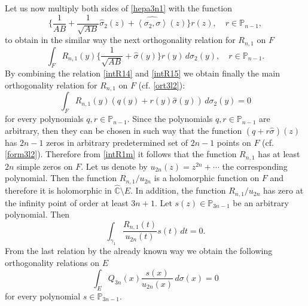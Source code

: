 \documentclass[11pt, a4paper, twoside]{article}
\def\<{\left\langle}
\def\>{\right\rangle}
\let\myh\widehat
\def\CC{\mathbb C}
\def\PP{\mathbb P}
\theoremstyle{plain}
\theoremstyle{definition}
\begin{document}
Let us now multiply both sides of \eqref{hepa3n1} with the function
$$
\biggl\{\frac1{AB}+\frac1{\sqrt{AB}}\myh{\sigma}_2(z)+\myh{\<\sigma_2,\sigma\>}(z)\biggr\}r(z),
\quad r\in\PP_{n-1},
$$
to obtain in the similar way the next orthogonality relation for $R_{n,1}$ on $F$
\begin{equation}
\int_F R_{n,1}(y)\biggl\{\frac1{\sqrt{AB}}+\myh{\sigma}(y)\biggr\}r(y)\,d\sigma_2(y),
\quad r\in\PP_{n-1}.
\label{intR15}
\end{equation}
By combining the relation \eqref{intR14} and \eqref{intR15} we obtain finally the main orthogonality relation for $R_{n,1}$  on $F$ (cf. \eqref{ort3l2}):
\begin{equation}
\int_F R_{n,1}(y)(q(y)+r(y)\myh{\sigma}(y))
\,d\sigma_2(y)=0
\label{intR1m}
\end{equation}
for every polynomials $q,r\in\PP_{n-1}$. Since the polynomials $q,r\in\PP_{n-1}$ are arbitrary, then they can be chosen in such way that the function $(q+r\myh \sigma)(z)$ has $2n-1$ zeros in arbitrary predetermined set of $2n-1$ points on $F$ (cf. \eqref{form3l2}). Therefore from \eqref{intR1m} it follows that the function $R_{n,1}$ has at least $2n$ simple zeros on $F$. Let us denote by $u_{2n}(z)=z^{2n}+\dotsb$ the corresponding polynomial. Then the function $R_{n,1}/u_{2n}$ is a holomorphic function on $F$ and therefore it is holomorphic in  $\myh{\CC}\setminus E$. In addition, the function $R_{n,1}/u_{2n}$ has zero at the infinity point of order at least  $3n+1$. Let $s(z)\in\PP_{3n-1}$ be an arbitrary polynomial. Then 
$$
\int_{\gamma_1}\frac{R_{n,1}(t)}{u_{2n}(t)}s(t)\,dt=0.
$$
From the last relation by the already known way we obtain the following orthogonality relations on $E$
\begin{equation}
\int_E  Q_{3n}(x)\frac{s(x)}{u_{2n}(x)}\,d\sigma(x)=0
\label{ortQu}
\end{equation}
for every polynomial $s\in\PP_{3n-1}$. 
\end{document}
